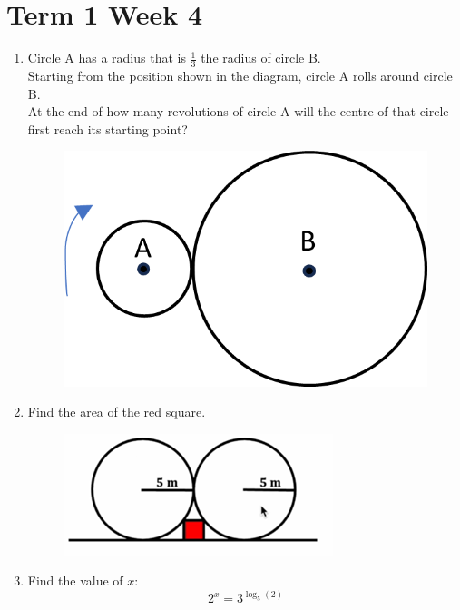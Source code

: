 \documentclass[../main.tex]{subfiles}
\begin{document}
\section*{Term 1 Week 4}
\begin{enumerate}
    \item 
    Circle A has a radius that is \(\frac{1}{3}\) the radius of circle B. \\
    
    Starting from the position shown in the diagram, circle A rolls around circle B.\\
    
    At the end of how many revolutions of circle A will the centre of that circle first reach its starting point?\\
    \begin{figure}[h]
        \centering
        \includegraphics{images/t1w4q1.png}
    \end{figure}

    \item 
    Find the area of the red square.\\
    \begin{figure}[h]
        \centering
        \includegraphics{images/t1w4q2.png}
    \end{figure}

    \item 
    Find the value of \(x\):\\
    \[2^x=3^{\log_5(2)}\]
\end{enumerate}
\end{document}

